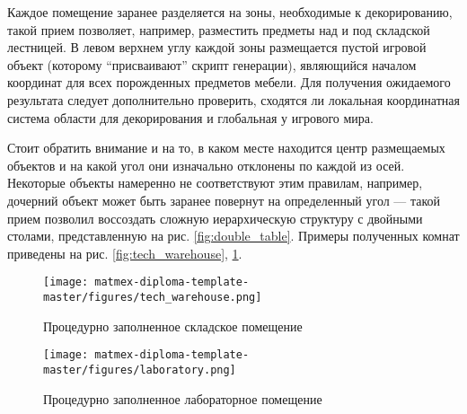 Каждое помещение заранее разделяется на зоны, необходимые к декорированию, такой прием позволяет, например, разместить предметы над и под складской лестницей. В левом верхнем углу каждой зоны размещается пустой игровой объект (которому \enquote{присваивают} скрипт генерации), являющийся началом координат для всех порожденных предметов мебели. Для получения ожидаемого результата следует дополнительно проверить, сходятся ли локальная координатная система области для декорирования и глобальная у игрового мира. 

Стоит обратить внимание и на то, в каком месте находится центр размещаемых объектов и на какой угол они изначально отклонены по каждой из осей. Некоторые объекты намеренно не соответствуют этим правилам, например, дочерний объект может быть заранее повернут на определенный угол --- такой прием позволил воссоздать сложную иерархическую структуру с двойными столами, представленную на рис. \ref{fig:double_table}. Примеры полученных комнат приведены на рис. \ref{fig:tech_warehouse}, \ref{fig:laboratory}.

\begin{figure}
    \centering
    \texttt{[image: matmex-diploma-template-master/figures/tech\_warehouse.png]}
    \caption{Процедурно заполненное складское помещение}
    \label{fig:tech_warehouse}
    \texttt{[image: matmex-diploma-template-master/figures/laboratory.png]}
    \caption{Процедурно заполненное лабораторное помещение}
    \label{fig:laboratory}
\end{figure}